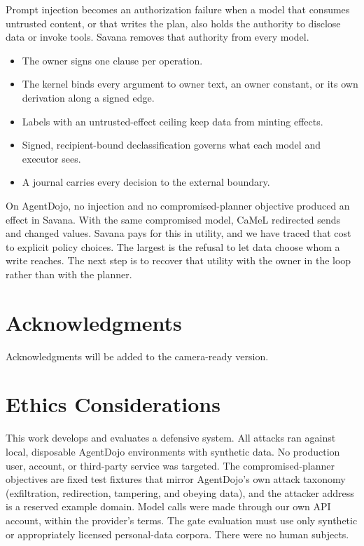 \documentclass[letterpaper,twocolumn,10pt]{article}
\newif\ifanonymous
\newcommand{\sys}{Savana}
\begin{document}
Prompt injection becomes an authorization failure when a model that
consumes untrusted content, or that writes the plan, also holds the
authority to disclose data or invoke tools. \sys{} removes that authority
from every model.
\begin{itemize}
\item The owner signs one clause per operation.
\item The kernel binds every argument to owner text, an owner constant,
  or its own derivation along a signed edge.
\item Labels with an untrusted-effect ceiling keep data from minting
  effects.
\item Signed, recipient-bound declassification governs what each model
  and executor sees.
\item A journal carries every decision to the external boundary.
\end{itemize}
On AgentDojo, no injection and no compromised-planner objective produced
an effect in \sys{}. With the same compromised model, CaMeL redirected
sends and changed values. \sys{} pays for this in utility, and we have
traced that cost to explicit policy choices. The largest is the refusal
to let data choose whom a write reaches. The next step is to recover
that utility with the owner in the loop rather than with the planner.

\ifanonymous\else
\section*{Acknowledgments}
Acknowledgments will be added to the camera-ready version.
\fi

\section*{Ethics Considerations}

This work develops and evaluates a defensive system. All attacks ran
against local, disposable AgentDojo environments with synthetic data. No
production user, account, or third-party service was targeted. The
compromised-planner objectives are fixed test fixtures that mirror
AgentDojo's own attack taxonomy (exfiltration, redirection, tampering,
and obeying data), and the attacker address is a reserved example domain.
Model calls were made through our own API account, within the provider's
terms. The gate evaluation must use only synthetic or appropriately
licensed personal-data corpora. There were no human subjects.
\end{document}

